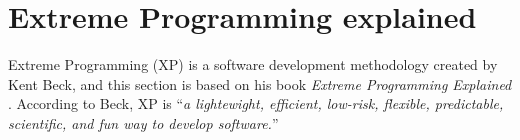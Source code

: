 \section{Extreme Programming explained}
Extreme Programming (XP) is a software development methodology created by Kent Beck, and this section is based on his book \textit{Extreme Programming Explained} \citep{xp:explained}. According to Beck, XP is ``\textit{a lightewight, efficient, low-risk, flexible, predictable, scientific, and fun way to develop software.}''

